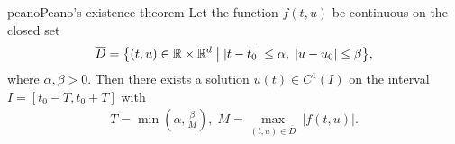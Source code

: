 \begin{Theorem*}{peano}{Peano's existence theorem}
  \label{satz:peano}
  Let the function $f(t,u)$ be continuous on the closed set
  \begin{gather*}
    \overline D =\bigl\{
    (t,u) \in \mathbb R\times\mathbb R^d \;\big|
    \;|t-t_0| \le \alpha,\;
    |u-u_0|\le\beta
    \bigr\},
  \end{gather*}
  where $\alpha,\beta>0$. Then there exists a solution
    $u(t) \in C^1(I)$
  on the interval
    $I=[t_0-T,t_0+T]$
  with
  \begin{gather*}
    T=\min\left(\alpha ,\frac{\beta}{M}\right),\;
    M=\max_{(t,u)\in \overline D} \ |f(t,u)|.
  \end{gather*}
\end{Theorem*}

